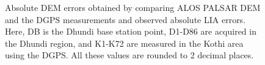 \documentclass[12pt]{elsarticle}
\numberwithin{equation}{section}
\numberwithin{figure}{section}
\numberwithin{table}{section}
\begin{document}
\begin{figure}[ht]
    \centering
    \begin{subfigure}[t]{0.9\textwidth}
        \caption{}
        \label{subfig:dem_error}
    \end{subfigure}
    \begin{subfigure}[t]{0.9\textwidth}
        \caption{}
        \label{subfig:lia_error}
    \end{subfigure}
    \caption{\doublespacing{} Absolute DEM errors obtained by comparing ALOS PALSAR DEM and the DGPS measurements and  observed absolute LIA errors. Here, DB is the Dhundi base station point, D1-D86 are acquired in the Dhundi region, and K1-K72 are measured in the Kothi area using the DGPS. All these values are rounded to 2 decimal places.}
    \label{fig:error}
\end{figure}
\end{document}

